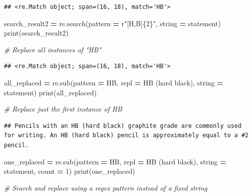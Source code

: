 \documentclass[
]{book}
\newenvironment{Shaded}{\begin{snugshade}}{\end{snugshade}}
\newcommand{\BuiltInTok}[1]{#1}
\newcommand{\CommentTok}[1]{\textcolor[rgb]{0.56,0.35,0.01}{\textit{#1}}}
\newcommand{\DecValTok}[1]{\textcolor[rgb]{0.00,0.00,0.81}{#1}}
\newcommand{\NormalTok}[1]{#1}
\newcommand{\OperatorTok}[1]{\textcolor[rgb]{0.81,0.36,0.00}{\textbf{#1}}}
\newcommand{\SpecialCharTok}[1]{\textcolor[rgb]{0.00,0.00,0.00}{#1}}
\newcommand{\StringTok}[1]{\textcolor[rgb]{0.31,0.60,0.02}{#1}}
\newcommand{\VerbatimStringTok}[1]{\textcolor[rgb]{0.31,0.60,0.02}{#1}}
\begin{document}
\begin{verbatim}
## <re.Match object; span=(16, 18), match='HB'>
\end{verbatim}

\begin{Shaded}
\begin{Highlighting}[]
\NormalTok{search\_result2 }\OperatorTok{=}\NormalTok{ re.search(pattern }\OperatorTok{=} \VerbatimStringTok{r"[H,B]}\SpecialCharTok{\{2\}}\VerbatimStringTok{"}\NormalTok{, string }\OperatorTok{=}\NormalTok{ statement)}
\BuiltInTok{print}\NormalTok{(search\_result2)}

\CommentTok{\# Replace all instances of "HB"}
\end{Highlighting}
\end{Shaded}

\begin{verbatim}
## <re.Match object; span=(16, 18), match='HB'>
\end{verbatim}

\begin{Shaded}
\begin{Highlighting}[]
\NormalTok{all\_replaced }\OperatorTok{=}\NormalTok{ re.sub(pattern }\OperatorTok{=} \StringTok{\textquotesingle{}HB\textquotesingle{}}\NormalTok{, repl }\OperatorTok{=} \StringTok{\textquotesingle{}HB (hard black)\textquotesingle{}}\NormalTok{, string }\OperatorTok{=}\NormalTok{ statement)}
\BuiltInTok{print}\NormalTok{(all\_replaced)}

\CommentTok{\# Replace just the first instance of HB}
\end{Highlighting}
\end{Shaded}

\begin{verbatim}
## Pencils with an HB (hard black) graphite grade are commonly used for writing. An HB (hard black) pencil is approximately equal to a #2 pencil.
\end{verbatim}

\begin{Shaded}
\begin{Highlighting}[]
\NormalTok{one\_replaced }\OperatorTok{=}\NormalTok{ re.sub(pattern }\OperatorTok{=} \StringTok{\textquotesingle{}HB\textquotesingle{}}\NormalTok{, repl }\OperatorTok{=} \StringTok{\textquotesingle{}HB (hard black)\textquotesingle{}}\NormalTok{, string }\OperatorTok{=}\NormalTok{ statement, count }\OperatorTok{=} \DecValTok{1}\NormalTok{)}
\BuiltInTok{print}\NormalTok{(one\_replaced)}

\CommentTok{\# Search and replace using a regex pattern instead of a fixed string}
\end{Highlighting}
\end{Shaded}
\end{document}
